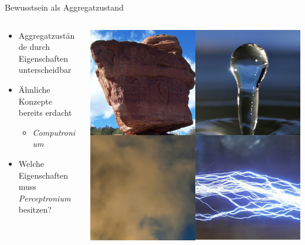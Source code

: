 \begin{frame}{Bewusstsein als Aggregatzustand}
	\begin{columns}
		\begin{column}{0.55\textwidth}
			\begin{itemize}
				\item{Aggregatzustände durch Eigenschaften unterscheidbar}
				\item{Ähnliche Konzepte bereits erdacht}
				\begin{itemize}
					\item{\emph{Computronium}}
				\end{itemize}
				\item{Welche Eigenschaften muss \emph{Perceptronium} besitzen?}
			\end{itemize}
		\end{column}
		\begin{column}{0.45\textwidth}
			\centering
			\includegraphics[scale=0.15]{graphics/states_of_matter.jpg}\\\hfill\cite{pic_stone,pic_water_droplet,steam_eruption,lightning_teslacoil}
		\end{column}
	\end{columns}
\end{frame}